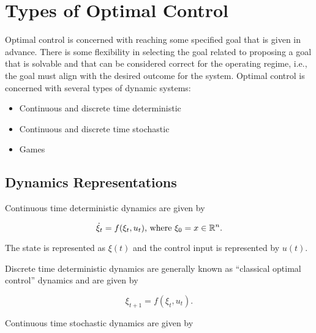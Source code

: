 \mainmatter%
\setcounter{page}{1}

\lectureseries[\course]{\course}

\date{September 24, 2009}

\setaddress%

\setcounter{lecture}{0}
\setcounter{chapter}{0}


\section{Types of Optimal Control}
Optimal control is concerned with reaching some specified goal that is given in advance.
There is some flexibility in selecting the goal related to proposing a goal that is solvable and that can be considered correct for the operating regime, i.e., the goal must align with the desired outcome for the system.
Optimal control is concerned with several types of dynamic systems:

\begin{itemize}
  \item Continuous and discrete time deterministic
  \item Continuous and discrete time stochastic
  \item Games
\end{itemize}

\subsection{Dynamics Representations}
Continuous time deterministic dynamics are given by

\begin{equation*}
\dot\xi_t = f(\xi_t,u_t) \textnormal{, where } \xi_0 = x \in \mathbb{R}^n.
\end{equation*}

The state is represented as $\xi(t)$ and the control input is represented by $u(t)$.

Discrete time deterministic dynamics are generally known as ``classical optimal control'' dynamics and are given by

\begin{equation*}
\xi_{t+1} = f(\xi_t,u_t).
\end{equation*}

Continuous time stochastic dynamics are given by

